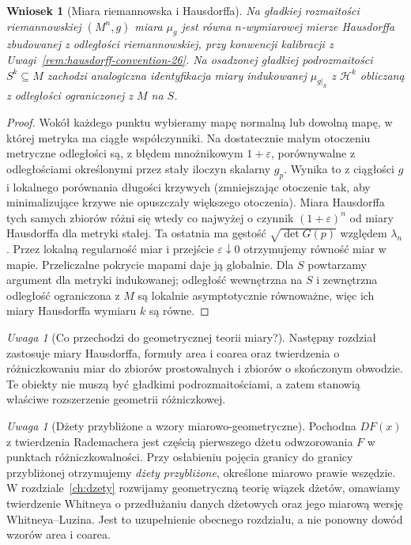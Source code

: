 \documentclass[11pt,a4paper,oneside]{book}
\numberwithin{equation}{chapter}
\theoremstyle{plain}
\newtheorem{wniosek}[twierdzenie]{Wniosek}
\theoremstyle{definition}
\theoremstyle{remark}
\newtheorem{uwaga}[twierdzenie]{Uwaga}
\begin{document}
\begin{wniosek}[Miara riemannowska i Hausdorffa]
\label{cor:riemann-hausdorff-28}
Na gładkiej rozmaitości riemannowskiej $(M^n,g)$
miara $\mu_g$ jest równa $n$-wymiarowej mierze
Hausdorffa zbudowanej z odległości riemannowskiej,
przy konwencji kalibracji z
Uwagi~\ref{rem:hausdorff-convention-26}. Na osadzonej
gładkiej podrozmaitości $S^k\subseteq M$ zachodzi
analogiczna identyfikacja miary indukowanej
$\mu_{g|_S}$ z $\mathcal H^k$ obliczaną
z odległości ograniczonej z $M$ na $S$.
\end{wniosek}
\begin{proof}
Wokół każdego punktu wybieramy mapę normalną
lub dowolną mapę, w której metryka ma ciągłe
współczynniki. Na dostatecznie małym otoczeniu
metryczne odległości są, z błędem mnożnikowym
$1+\varepsilon$, porównywalne z odległościami
określonymi przez stały iloczyn skalarny
$g_p$. Wynika to z ciągłości $g$ i
lokalnego porównania długości krzywych
(zmniejszając otoczenie tak, aby minimalizujące
krzywe nie opuszczały większego otoczenia).
Miara Hausdorffa tych samych zbiorów różni się
wtedy co najwyżej o czynnik $(1+\varepsilon)^n$
od miary Hausdorffa dla metryki stałej.
Ta ostatnia ma gęstość $\sqrt{\det G(p)}$
względem $\lambda_n$. Przez lokalną
regularność miar i przejście $\varepsilon\downarrow0$
otrzymujemy równość miar w mapie. Przeliczalne
pokrycie mapami daje ją globalnie.
Dla $S$ powtarzamy argument dla metryki
indukowanej; odległość wewnętrzna na $S$
i zewnętrzna odległość ograniczona z $M$
są lokalnie asymptotycznie równoważne,
więc ich miary Hausdorffa wymiaru $k$ są równe.
\end{proof}

\begin{uwaga}[Co przechodzi do geometrycznej teorii miary?]
Następny rozdział zastosuje miary Hausdorffa,
formuły area i coarea oraz twierdzenia o
różniczkowaniu miar do zbiorów prostowalnych
i zbiorów o skończonym obwodzie. Te obiekty
nie muszą być gładkimi podrozmaitościami,
a zatem stanowią właściwe rozszerzenie
geometrii różniczkowej.
\end{uwaga}

\begin{uwaga}[Dżety przybliżone a wzory miarowo-geometryczne]
Pochodna $DF(x)$ z twierdzenia Rademachera jest częścią
pierwszego dżetu odwzorowania $F$ w punktach różniczkowalności.
Przy osłabieniu pojęcia granicy do granicy przybliżonej otrzymujemy
\emph{dżety przybliżone}, określone miarowo prawie wszędzie.
W rozdziale~\ref{ch:dzety} rozwijamy geometryczną teorię wiązek
dżetów, omawiamy twierdzenie Whitneya o przedłużaniu danych
dżetowych oraz jego miarową wersję Whitneya--Luzina.
Jest to uzupełnienie obecnego rozdziału, a nie ponowny dowód
wzorów area i coarea.
\end{uwaga}
\end{document}
